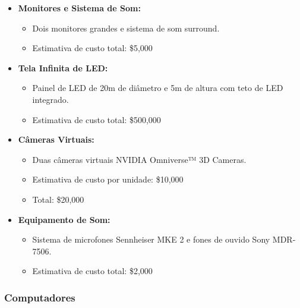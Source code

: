 \begin{itemize}
    \item \textbf{Monitores e Sistema de Som:}
    \begin{itemize}
        \item Dois monitores grandes e sistema de som surround.
        \item Estimativa de custo total: \$5,000
    \end{itemize}
    
    \item \textbf{Tela Infinita de LED:}
    \begin{itemize}
        \item Painel de LED de 20m de diâmetro e 5m de altura com teto de LED integrado.
        \item Estimativa de custo total: \$500,000
    \end{itemize}
    
    \item \textbf{Câmeras Virtuais:}
    \begin{itemize}
        \item Duas câmeras virtuais NVIDIA Omniverse™ 3D Cameras.
        \item Estimativa de custo por unidade: \$10,000
        \item Total: \$20,000
    \end{itemize}
    
    \item \textbf{Equipamento de Som:}
    \begin{itemize}
        \item Sistema de microfones Sennheiser MKE 2 e fones de ouvido Sony MDR-7506.
        \item Estimativa de custo total: \$2,000
    \end{itemize}
\end{itemize}

\subsubsection{Computadores}

